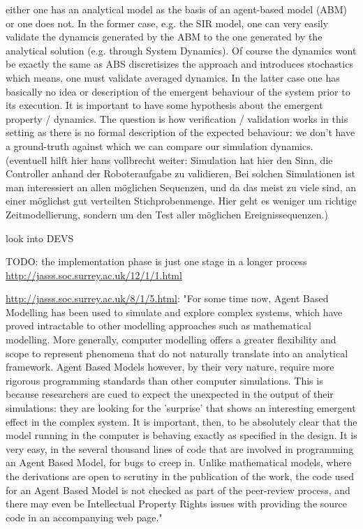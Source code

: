 either one has an analytical model as the basis of an agent-based model (ABM) or one does not.
In the former case, e.g. the SIR model, one can very easily validate the dynamcis generated by the ABM to the one generated by the analytical solution (e.g. through System Dynamics). Of course the dynamics wont be exactly the same as ABS discretisizes the approach and introduces stochastics which means, one must validate averaged dynamics.
In the latter case one has basically no idea or description of the emergent behaviour of the system prior to its execution. It is important to have some hypothesis about the emergent property / dynamics. The question is how verification / validation works in this setting as there is no formal description of the expected behaviour: we don't have a ground-truth against which we can compare our simulation dynamics. (eventuell hilft hier hans vollbrecht weiter: Simulation hat hier den Sinn, die Controller anhand der Roboteraufgabe zu validieren, Bei solchen Simulationen ist man interessiert an allen möglichen Sequenzen, und da das meist zu viele sind, an einer möglichst gut verteilten Stichprobenmenge. Hier geht es weniger um richtige Zeitmodellierung, sondern um den Test aller möglichen Ereignissequenzen.)

look into DEVS

TODO: the implementation phase is just one stage in a longer process \url{http://jasss.soc.surrey.ac.uk/12/1/1.html}

\url{http://jasss.soc.surrey.ac.uk/8/1/5.html}: "For some time now, Agent Based Modelling has been used to simulate and explore complex systems, which have proved intractable to other modelling approaches such as mathematical modelling. More generally, computer modelling offers a greater flexibility and scope to represent phenomena that do not naturally translate into an analytical framework. Agent Based Models however, by their very nature, require more rigorous programming standards than other computer simulations. This is because researchers are cued to expect the unexpected in the output of their simulations: they are looking for the 'surprise' that shows an interesting emergent effect in the complex system. It is important, then, to be absolutely clear that the model running in the computer is behaving exactly as specified in the design. It is very easy, in the several thousand lines of code that are involved in programming an Agent Based Model, for bugs to creep in. Unlike mathematical models, where the derivations are open to scrutiny in the publication of the work, the code used for an Agent Based Model is not checked as part of the peer-review process, and there may even be Intellectual Property Rights issues with providing the source code in an accompanying web page."

